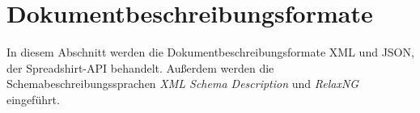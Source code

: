 \section{Dokumentbeschreibungsformate}
\label{sec:document_description_formats}

In diesem Abschnitt werden die Dokumentbeschreibungsformate \gls{XML} und \gls{JSON}, der Spreadshirt-API behandelt. Außerdem werden die Schemabeschreibungssprachen \emph{XML Schema Description} und \emph{RelaxNG} eingeführt.






